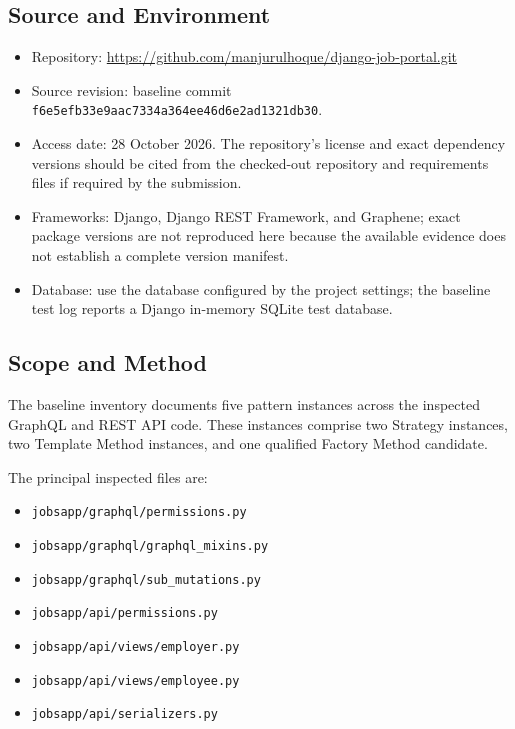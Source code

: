 \documentclass[11pt,a4paper]{article}
\newcommand{\code}[1]{\texttt{#1}}
\begin{document}
\subsection{Source and Environment}

\begin{itemize}[leftmargin=*]
    \item Repository:
    \url{https://github.com/manjurulhoque/django-job-portal.git}

    \item Source revision: baseline commit
    \code{f6e5efb33e9aac7334a364ee46d6e2ad1321db30}.

    \item Access date: 28 October 2026. The repository's license
    and exact dependency versions should be cited from the checked-out
    repository and requirements files if required by the submission.

    \item Frameworks: Django, Django REST Framework, and Graphene;
    exact package versions are not reproduced here because the available
    evidence does not establish a complete version manifest.

    \item Database: use the database configured by the project settings;
    the baseline test log reports a Django in-memory SQLite test database.
\end{itemize}

\subsection{Scope and Method}

The baseline inventory documents five pattern instances
across the inspected GraphQL and REST API code. These
instances comprise two Strategy instances, two Template
Method instances, and one qualified Factory Method candidate.

The principal inspected files are:

\begin{itemize}[leftmargin=*]
    \item \code{jobsapp/graphql/permissions.py}
    \item \code{jobsapp/graphql/graphql\_mixins.py}
    \item \code{jobsapp/graphql/sub\_mutations.py}
    \item \code{jobsapp/api/permissions.py}
    \item \code{jobsapp/api/views/employer.py}
    \item \code{jobsapp/api/views/employee.py}
    \item \code{jobsapp/api/serializers.py}
\end{itemize}
\end{document}
